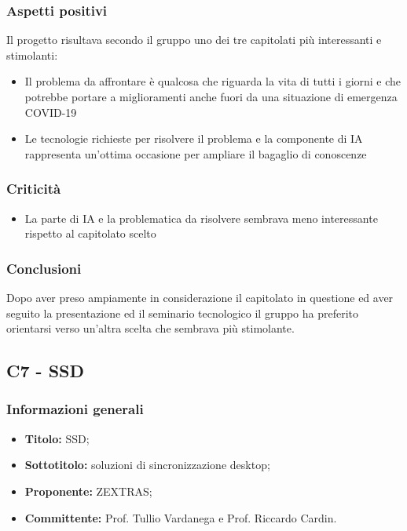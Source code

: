\documentclass[]{article}
\begin{document}
		\subsubsection{Aspetti positivi}
		Il progetto risultava secondo il gruppo uno dei tre capitolati più interessanti e stimolanti:
		\begin{itemize}			
		\item \textsc Il problema da affrontare è qualcosa che riguarda la vita di tutti i giorni e che potrebbe portare a miglioramenti anche fuori da una situazione di emergenza COVID-19
		\item \textsc Le tecnologie richieste per risolvere il problema e la componente di IA rappresenta un’ottima occasione per ampliare il bagaglio di conoscenze	
		\end{itemize}
		
		\subsubsection{Criticità}
		\begin{itemize}
			\item La parte di IA e la problematica da risolvere sembrava meno interessante rispetto al capitolato scelto
		\end{itemize}
		
		\subsubsection{Conclusioni}
		Dopo aver preso ampiamente in considerazione il capitolato in questione ed aver seguito la presentazione ed il seminario tecnologico il gruppo ha preferito orientarsi verso un’altra scelta che sembrava più stimolante. 
		
		\newpage 
		
		
		\subsection{C7 - SSD}
		\subsubsection{Informazioni generali}
		\begin{itemize}
			\item \textbf{Titolo:} SSD;
			\item \textbf{Sottotitolo:} soluzioni di sincronizzazione desktop;
			\item \textbf{Proponente:} ZEXTRAS;
			\item \textbf{Committente:} Prof. Tullio Vardanega e Prof. Riccardo Cardin.
		\end{itemize}
		
\end{document}
